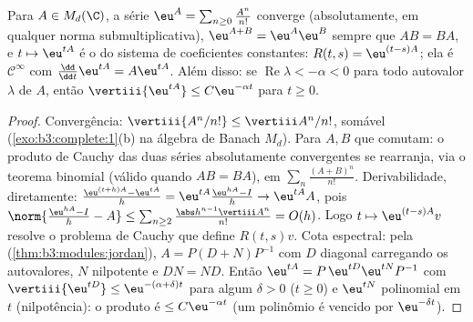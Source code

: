 \begin{theorem}\label{thm:b3:ode:matrixexp}
Para $A \in M_d(\C)$, a série $\eu^{A} =
\sum_{n\geq0}\frac{A^n}{n!}$ converge (absolutamente, em qualquer norma
submultiplicativa), $\eu^{A+B} = \eu^A\eu^B$ sempre que $AB = BA$, e $t \mapsto \eu^{tA}$ é o  do
sistema de coeficientes constantes: $R(t,s) = \eu^{(t-s)A}$; ela é $\mathcal
C^\infty$ com $\frac{\dd}{\dd t}\eu^{tA} = A\eu^{tA}$. Além
disso: se $\operatorname{Re}\lambda < -\alpha < 0$ para todo autovalor $\lambda$ de $A$, então $\vertiii{\eu^{tA}}
\leq C\eu^{-\alpha t}$ para
$t \geq 0$.
\end{theorem}

\begin{proof}
Convergência: $\vertiii{A^n/n!} \leq \vertiii A^n/n!$, somável (\cref{exo:b3:complete:1}(b) na álgebra de Banach
$M_d$). Para $A, B$ que comutam: o produto de Cauchy das duas
séries absolutamente convergentes se rearranja, via o teorema binomial
(válido quando $AB = BA$), em $\sum_n\frac{(A+B)^n}{n!}$. Derivabilidade, diretamente: $\frac{\eu^{(t+h)A} - \eu^{tA}}h = \eu^{tA}\frac{\eu^{hA} -
I}{h} \to \eu^{tA}A$,
pois $\norm{\frac{\eu^{hA} - I}h - A}
\leq \sum_{n\geq2}\frac{\abs h^{n-1}\vertiii A^n}{n!} =
O(h)$. Logo $t \mapsto \eu^{(t - s)A}v$ resolve o problema de Cauchy que define $R(t,s)v$.
Cota espectral: pela  (\cref{thm:b3:modules:jordan}), $A = P(D + N)P^{-1}$ com
$D$ diagonal carregando os autovalores, $N$ nilpotente e $DN =
ND$.
Então $\eu^{tA} = P\,\eu^{tD}\eu^{tN}P^{-1}$ com $\vertiii{\eu^{tD}} \leq \eu^{-(\alpha + \delta)t}$ para algum $\delta > 0$ ($t \geq 0$) e $\eu^{tN}$ polinomial em
$t$ (nilpotência): o produto é $\leq C\eu^{-\alpha t}$ (um polinômio é vencido por
$\eu^{-\delta t}$).
\end{proof}

